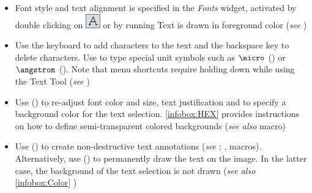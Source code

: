 \begin{itemize}
\item Font style and text alignment is specified in the \emph{Fonts} widget,
activated by double clicking on \includegraphics[bb=0bp 5bp 20bp 20bp,scale=0.6]{images/tools/Text}
or by running 
Text is drawn in foreground color (\emph{see} )
\item Use the keyboard to add characters to the text and the backspace key
to delete characters. Use  to type special unit
symbols such as $\micro$ () or
$\angstrom$ ().
Note that menu shortcuts require holding down 
while using the Text Tool (\emph{see} )
\item Use  ()
to re-adjust font color and size, text justification and to specify
a background color for the text selection. \ref{infobox:HEX} 
provides instructions on how to define semi-transparent colored backgrounds
(\emph{see also} 
macro)
\item Use  ()
to create non-destructive text annotations (\emph{see} ;
,
macros). Alternatively, use  ()
to permanently draw the text on the image. In the latter case, the
background of the text selection is not drawn (\emph{see also} \ref{infobox:Color}
)
\end{itemize}



